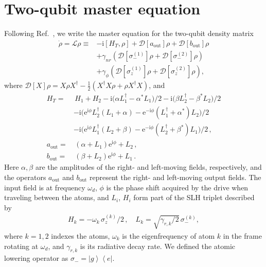 \documentclass[pra, twocolumn, amsmath, amssymb, notitlepage, longbibliography, showpacs, superscriptaddress]{revtex4-1}
\newcommand{\bra}[1]{\ensuremath{\left\langle #1\r|}}
\newcommand{\ket}[1]{\ensuremath{\left|#1\r\rangle}}
\newcommand{\cc}{^{\ast}}							%
\newcommand{\hc}{^{\dagger}}							%
\newcommand{\ee}{\mathrm{e}}						%
\newcommand{\ii}{\mathrm{i}}			             			%
\newcommand{\comm}[2]{\left[ #1, #2 \right]} 				%
\newcommand{\nn}{\nonumber}							%
\newcommand{\diss}[1]{\mathcal{D}[ #1 ]}					%
\renewcommand{\l}[0]{\left}
\renewcommand{\r}[0]{\right}
\begin{document}
\section{Two-qubit master equation}
\label{twoQubit}

Following Ref.~\cite{Muller2017a}, we write the master equation for the 
two-qubit density matrix 
\begin{align}
	\dot{\rho} = \mathcal{L}\rho\equiv  & -\ii \comm{H_T}{\rho} + \diss{a_{\text{out}}}\rho + \diss{b_{\text{out}}}\rho \nn \\ 
	&  +\gamma_{nr}\l(\diss{\sigma_-^{(1)}}\rho+\diss{\sigma_-^{(2)}}\rho\r) \nn\\
	& + \gamma_\phi \l(\diss{\sigma_z^{(1)}}\rho+\diss{\sigma_z^{(2)}}\rho\r),
	\label{eqME}
\end{align}
where $\diss{X}\rho=X\rho X\hc-\tfrac12(X\hc X\rho +\rho X\hc X)$, and 
\begin{align*}
	H_T =& \,H_1 + H_2 -\ii %
	\big( \alpha L_1\hc - \alpha\cc L_1 \big)/2 -\ii %
	 \big( \beta L_2\hc - \beta\cc L_2 \big)/2 \nn\\
		&-\ii %
		 \big( \ee^{\ii \phi} L_2\hc (L_1 + \alpha) - \ee^{-\ii \phi} (L_1\hc + \alpha\cc) L_2 \big)/{2} \nn\\
		&-\ii %
		\big( \ee^{\ii \phi} L_1\hc (L_2 + \beta) - \ee^{-\ii \phi} (L_2\hc + \beta\cc) L_1 \big)/{2} \,, \\
	a_\textrm{out}=& \,(\alpha+L_1)\ee^{\ii \phi} + L_2  \,,\\
	b_\textrm{out}=& \,(\beta+L_2)\ee^{\ii \phi} + L_1  \,.
\end{align*}
Here $\alpha,\beta$ are the amplitudes of the right-
and left-moving fields, respectively, and the operators 
$a_{\text{out}}$ and $b_{\text{out}}$ represent the right- and left-moving output fields.  
The input field is at frequency $\omega_d$, $\phi$ is the phase shift acquired by 
the drive when traveling between the atoms,
and $L_i$, $H_i$ form part of the SLH triplet \cite{CombKercSaro16} described by
\begin{align*}
	H_k =  - \omega_k\, \sigma_z^{(k)} /2\,,\quad   
	L_k = \sqrt{{\gamma_{r,k}}/2}\, \sigma_-^{(k)},
\end{align*}
where $k=1,2$ indexes the atoms, $\omega_k$ is the eigenfrequency of 
atom $k$ in the frame rotating at $\omega_d$, and $\gamma_{r,k}$ is its radiative decay rate. 
We defined the atomic lowering operator as $ \sigma_-={\ket{g}}{\bra{e}}$.  
\end{document}
